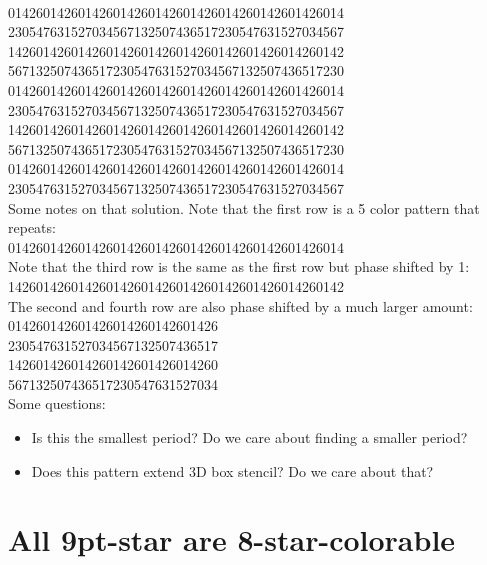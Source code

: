 \documentclass{article}
\newcommand{\highlightsol}[1]{{\color{blue}#1}}
\begin{document}
~\\
\highlightsol{014260142601426014260142601426}014260142601426014\\
\highlightsol{230547631527034567132507436517}230547631527034567\\
\highlightsol{142601426014260142601426014260}142601426014260142\\
\highlightsol{567132507436517230547631527034}567132507436517230\\
014260142601426014260142601426014260142601426014\\
230547631527034567132507436517230547631527034567\\
142601426014260142601426014260142601426014260142\\
567132507436517230547631527034567132507436517230\\
014260142601426014260142601426014260142601426014\\
230547631527034567132507436517230547631527034567\\

Some notes on that solution. Note that the first row is a 5 color pattern that repeats:\\
\highlightsol{01426}0142601426014260142601426014260142601426014\\

Note that the third row is the same as the first row but phase shifted by 1:\\
1426\highlightsol{01426}014260142601426014260142601426014260142\\

The second and fourth row are also phase shifted by a much larger amount:\\
014260142601426014260142601426\\
\highlightsol{230547631527034}567132507436517\\
142601426014260142601426014260\\
567132507436517\highlightsol{230547631527034}\\

Some questions:
\begin{itemize}
\item Is this the smallest period? Do we care about finding a smaller period?
\item Does this pattern extend 3D box stencil? Do we care about that?
\end{itemize}


\section{All 9pt-star are 8-star-colorable}
\end{document}

